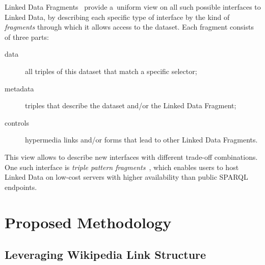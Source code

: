 \documentclass[letterpaper]{article}
\begin{document}
Linked Data Fragments~\cite{verborgh2014ldfiswc}
provide a~uniform view on all such possible interfaces to Linked Data,
by describing each specific type of interface
by the kind of \emph{fragments} through which it allows access to the dataset.
Each fragment consists of three parts:
\begin{description}
  \item[data] all triples of this dataset that match a specific selector;
  \item[metadata] triples that describe the dataset and/or the Linked Data Fragment;
  \item[controls] hypermedia links and/or forms that lead to other Linked Data Fragments.
\end{description}
This view allows to describe new interfaces
with different trade-off combinations.
One such interface is \emph{triple pattern fragments}~\cite{verborgh2014ldfiswc},
which enables users to host Linked Data
on low-cost servers with higher availability
than public SPARQL endpoints.

\section{Proposed Methodology}
\label{sec:Methodology}

\subsection{Leveraging Wikipedia Link Structure}
\end{document}
